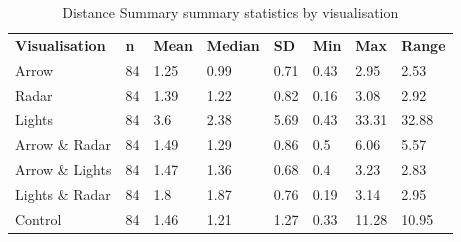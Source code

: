 \begin{table}[]
\caption{Distance Summary summary statistics by visualisation}
\label{tab:Distance_Summary}
\begin{tabular}{llllllll}
\textbf{Visualisation} & \textbf{n} & \textbf{Mean} & \textbf{Median} & \textbf{SD} & \textbf{Min} & \textbf{Max} & \textbf{Range} \\
Arrow                  & 84         & 1.25          & 0.99            & 0.71        & 0.43         & 2.95         & 2.53 \\
Radar                  & 84         & 1.39          & 1.22            & 0.82        & 0.16         & 3.08         & 2.92 \\
Lights                 & 84         & 3.6           & 2.38            & 5.69        & 0.43         & 33.31        & 32.88 \\
Arrow \& Radar         & 84         & 1.49          & 1.29            & 0.86        & 0.5          & 6.06         & 5.57 \\
Arrow \& Lights        & 84         & 1.47          & 1.36            & 0.68        & 0.4          & 3.23         & 2.83 \\
Lights \& Radar        & 84         & 1.8           & 1.87            & 0.76        & 0.19         & 3.14         & 2.95 \\
Control                & 84         & 1.46          & 1.21            & 1.27        & 0.33         & 11.28        & 10.95
\end{tabular}
\end{table}
